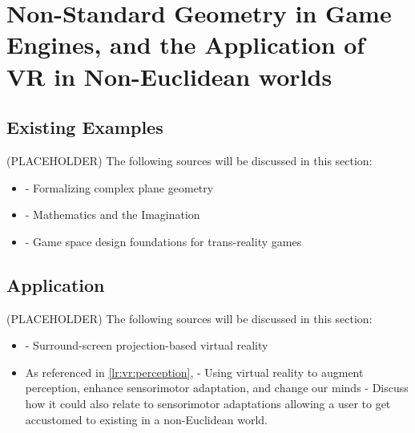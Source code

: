\section[Non-Standard Geometry in Game Engines, and VR Applications]{Non-Standard Geometry in Game Engines, and the Application of VR in Non-Euclidean worlds}
\label{lr:cross}

	

	\subsection{Existing Examples}
	\label{lr:ne:existing}
	

		(PLACEHOLDER) The following sources will be discussed in this section:
		\begin{itemize}
			\item \cite{Maric2014} - Formalizing complex plane geometry
			\item \cite{Turner2009} - Mathematics and the Imagination
			\item \cite{Lindley2005} - Game space design foundations for trans-reality games
		\end{itemize}
	
	\subsection{Application}
	\label{lr:cross:application}

		(PLACEHOLDER) The following sources will be discussed in this section:
		\begin{itemize}
			\item \cite{Cruz-Neira1993} - Surround-screen projection-based virtual reality
			\item As referenced in \ref{lr:vr:perception}, \cite{Wright2014} - Using virtual reality to augment perception, enhance sensorimotor adaptation, and change our minds - Discuss how it could also relate to sensorimotor adaptations allowing a user to get accustomed to existing i\textsl{}n a non-Euclidean world.
		\end{itemize}
	
